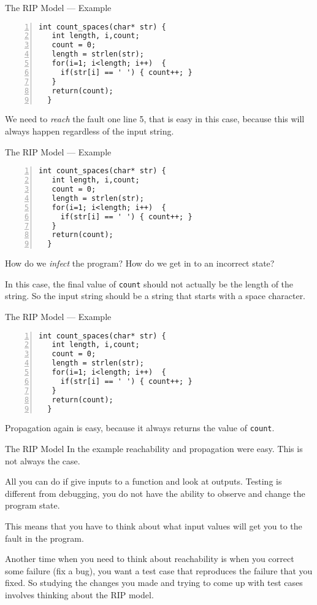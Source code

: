 \documentclass{beamer}
\begin{document}
  \begin{frame}[fragile]{The RIP Model --- Example}
  \begin{lstlisting}[numbers=left]
  int count_spaces(char* str) {
   int length, i,count;
   count = 0;
   length = strlen(str);
   for(i=1; i<length; i++)  { 
     if(str[i] == ' ') { count++; }
   }
   return(count);
  }
\end{lstlisting}
We need to {\em reach} the fault one line 5, that is easy in this case,
because this will always happen regardless of the input string.  
\end{frame}

\begin{frame}[fragile]{The RIP Model --- Example}
  \begin{lstlisting}[numbers=left]
  int count_spaces(char* str) {
   int length, i,count;
   count = 0;
   length = strlen(str);
   for(i=1; i<length; i++)  { 
     if(str[i] == ' ') { count++; }
   }
   return(count);
  }
\end{lstlisting}
How do we {\em infect} the program? How do we get in to an incorrect state?

In this case, the final  value of {\tt count} should not actually be
the length of the string. So the input string should be a string that
starts with a space character. 
\end{frame}

\begin{frame}[fragile]{The RIP Model --- Example}
  \begin{lstlisting}[numbers=left]
  int count_spaces(char* str) {
   int length, i,count;
   count = 0;
   length = strlen(str);
   for(i=1; i<length; i++)  { 
     if(str[i] == ' ') { count++; }
   }
   return(count);
  }
\end{lstlisting}
Propagation again is easy, because it always returns the value of {\tt count}.
\end{frame}

\begin{frame}{The RIP Model}
  In the example reachability and propagation were easy. This is not
  always the case.

 All you can do if give inputs to a function and look at
 outputs. Testing is different from debugging, you do not have the
 ability to observe and change the program state.

 This means that you have to think about what input values will get
 you to the fault in the program.

 Another time when you need to think about reachability is when you
 correct some failure (fix a bug), you want a test case that
 reproduces the failure that you fixed. So studying the changes you
 made and trying to come up with test cases involves thinking about
 the RIP model. 
  
\end{frame}
\end{document}
